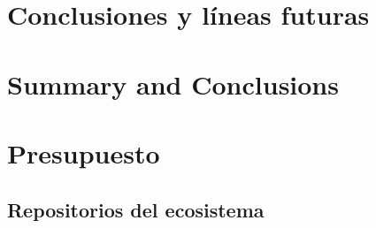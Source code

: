 \documentclass[spanish,a4paper,12pt,oneside]{extreport}
\begin{document}


\newpage{\pagestyle{empty}}
\thispagestyle{empty}

\chapter{\LARGE Conclusiones y líneas futuras}
\label{chapter:Resultados}



\newpage{\pagestyle{empty}}
\thispagestyle{empty}

\chapter{\LARGE Summary and Conclusions}
\label{chapter:Conclusiones}



\newpage{\pagestyle{empty}}
\thispagestyle{empty}

\chapter{\LARGE Presupuesto}
\label{chapter:presupuesto}



\newpage{\pagestyle{empty}\cleardoublepage}
\thispagestyle{empty}

\begin{appendix}

\chapter{\LARGE Repositorios del ecosistema}
\label{appendix:1}


\end{appendix}
\printglossary[title=Glosario, toctitle=Glosario]

%


 
%
\end{document}
